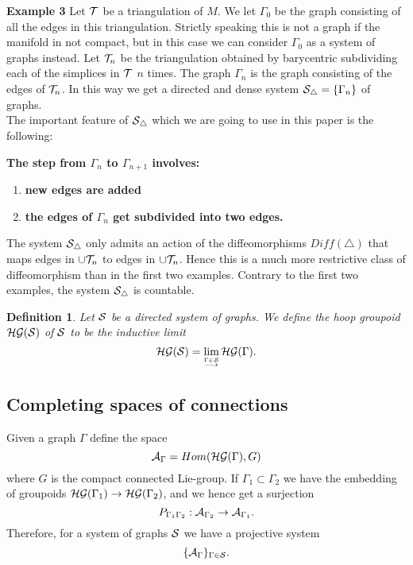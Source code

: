 \documentclass[12pt]{article}
\def\ca{{\cal A}}
\def\cg{{\cal G}}
\def\ch{{\cal H}}
\def\cs{{\cal S}}
\def\ct{{\cal T}}
\newtheorem{definition}[thm]{Definition}
\newcommand{\cG}{{\cal G}}
\begin{document}
\textbf{Example 3} Let  $\ct$ be a triangulation of $M$. We let $\Gamma_0$ be the graph consisting of all the edges in this triangulation. Strictly speaking this is not a graph if the manifold in not compact, but in this case we can consider $\Gamma_0$ as a system of graphs instead. Let $\ct_n$ be the triangulation obtained by barycentric subdividing each of the simplices in $\ct$ $n$ times. 
 The graph $\Gamma_n$ is  the graph consisting of the edges of $\ct_n$. In this way we get a directed and dense system  $\cs_\triangle =\{ \Gamma_n\}$ of graphs. \\ 

The important feature of $\cs_\triangle$ which we are going to use in this paper is the following: 
{\textbf{The step from $\Gamma_n$ to $\Gamma_{n+1}$ involves:}
\begin{enumerate}
\item  
{\textbf{new edges are added}}
\item 
{\textbf{the edges of $\Gamma_n$ get subdivided into two edges.}}
\end{enumerate}

The system $\cs_\triangle$ only admits an action of the diffeomorphisms $Diff (\triangle )$ that maps edges in $\cup \ct_n$ to edges in $\cup \ct_n$. Hence this is a much more restrictive class of diffeomorphism than in the first two examples. Contrary to the first two examples, the system $\cs_\triangle$ is countable. 


\begin{figure} [t]
\begin{center}
 
\caption{}
\label{JohannesFig}
\end{center}
\end{figure} 









\begin{definition}
Let $\cs$ be a directed system of graphs. We define the hoop groupoid $\ch\cg (\cs)$ of $\cs$ to be the inductive limit 
$$\ch\cg (\cs ) =\lim_{\stackrel{\Gamma \in \cs}{\longrightarrow}} \ch\cG (\Gamma ).$$  
\end{definition}



\subsection{Completing spaces of connections} 
 Given a graph $\Gamma$ define the space 
\[
\ca_\Gamma = Hom(\ch\cg(\Gamma),G)
\]
where $G$ is the compact connected Lie-group.
If $\Gamma_1 \subset \Gamma_2$ we have the embedding of groupoids $\ch\cg(\Gamma_1)\to \ch \cg (\Gamma_2)$, and we hence get a surjection
$$P_{\Gamma_1\Gamma_2}: \ca_{\Gamma_2} \to \ca_{\Gamma_1}. $$
Therefore, for a system of graphs $\cs$ we have a projective system 
$$\{ \ca_\Gamma \}_{\Gamma \in \cs}.$$
 
}
\end{document}
